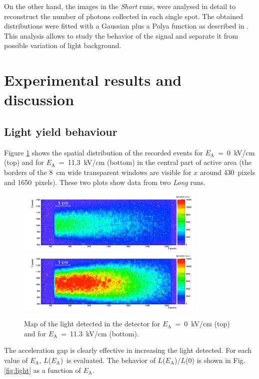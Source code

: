 \documentclass[a4paper,11pt]{article}
\newcommand{\Ea}  {$E_{\mathrm{A}}$}
\newcommand{\La}  {$L$(\Ea)}
\begin{document}
On the other hand, the images in the {\it Short} runs, were analysed in detail to reconstruct the number of photons collected in each single spot. The obtained distributions were fitted with a Gaussian plus a Polya function as described in \cite{bib:fe55}. This analysis allows to study the behavior of the signal and separate it from possible variation of light background.

\section{Experimental results and discussion}

\subsection{Light yield behaviour}
\label{sec:ly}
Figure \ref{fig:beam} shows the spatial distribution of the recorded events for \Ea~=~0~kV/cm (top) and for \Ea~=~11.3~kV/cm (bottom) in the central part of active area (the borders of the
8~cm wide transparent windows are visible for $x$ around 430~pixels and 1650~pixels).
These two plots show data from two {\it Long} runs.

\begin{figure}[ht]
\centering
\includegraphics[width=0.8\textwidth]{hImage_3590.png}\\
\includegraphics[width=0.8\textwidth]{hImage_3583.png}
\caption{Map of the light detected in the detector for \Ea~=~0~kV/cm (top) and for \Ea~=~11.3~kV/cm (bottom).} 
\label{fig:beam}
\end{figure}

The acceleration gap is clearly effective in increasing the light detected.
For each value of \Ea, \La\ is evaluated. 
The behavior of $L$(\Ea)/$L$(0) is shown in Fig.\ref{fig:light} as a function of \Ea.
\end{document}
